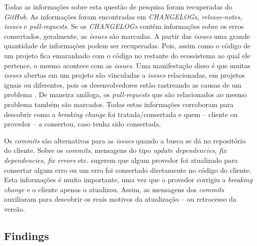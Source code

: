 Todas as informações sobre esta questão de pesquisa foram recuperadas do \textit{GitHub}. As informações foram encontradas em \textit{CHANGELOGs, release-notes, issues} e \textit{pull-requests}. Se os \textit{CHANGELOGs} contêm informações sobre os erros consertados, geralmente, as \textit{issues} são marcadas. A partir das \textit{issues} uma grande quantidade de informações podem ser recuperadas. Pois, assim como o código de um projeto fica emaranhado com o código no restante do ecossistema ao qual ele pertence, o mesmo acontece com as \textit{issues}. Uma manifestação disso é que muitas \textit{issues} abertas em um projeto são vinculadas a \textit{issues} relacionadas, em projetos iguais ou diferentes, pois os desenvolvedores estão rastreando as causas de um problema \cite{Zhang:2018:WIL:3242887.3242891}. De maneira análoga, os \textit{pull-requests} que são relacionados ao mesmo problema também são marcados. Todas estas informações corroboram para descobrir como a \textit{breaking change} foi tratada/consertada e quem -- cliente ou provedor -- a consertou, caso tenha sido consertada.

Os \textit{commits} são alternativas para as \textit{issues} quando a busca se dá no repositório do cliente. Sobre os \textit{commits}, mensagens do tipo \textit{update dependencies, fix dependencies, fix errors} etc. sugerem que algum provedor foi atualizado para consertar algum erro ou um erro foi consertado diretamente no código do cliente. Esta informações é muito importante, uma vez que o provedor corrigiu a \textit{breaking change} e o cliente apenas o atualizou. Assim, as mensagens dos \textit{commits} auxiliaram para descobrir os reais motivos da atualização -- ou retrocesso da versão.

\subsection{Findings}
\label{d_fin:rq3}